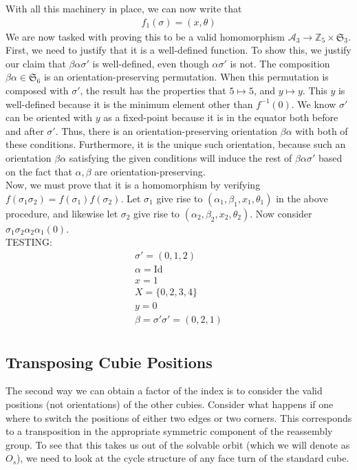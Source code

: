 \documentclass[10pt,letterpaper]{report}
\begin{document}
With all this machinery in place, we can now write that \begin{align*}
f_1(\sigma) = (x, \theta)
\end{align*}
We are now tasked with proving this to be a valid homomorphism $\mathcal{A}_3 \rightarrow \mathbb{Z}_5 \times \mathfrak{S}_3$.  First, we need to justify that it is a well-defined function.  To show this, we justify our claim that $\beta \alpha \sigma'$ is well-defined, even though $\alpha \sigma'$ is not.  The composition $\beta \alpha \in \mathfrak{S}_6$ is an orientation-preserving permutation.  When this permutation is composed with $\sigma'$, the result has the properties that $5 \mapsto 5$, and $y \mapsto y$.  This $y$ is well-defined because it is the minimum element other than $f^{-1}(0)$.  We know $\sigma'$ can be oriented with $y$ as a fixed-point because it is in the equator both before and after $\sigma'$.  Thus, there is an orientation-preserving orientation $\beta \alpha$ with both of these conditions.  Furthermore, it is the unique such orientation, because such an orientation $\beta \alpha$ satisfying the given conditions will induce the rest of $\beta \alpha \sigma'$ based on the fact that $\alpha, \beta$ are orientation-preserving. \\

Now, we must prove that it is a homomorphism by verifying $f(\sigma_1 \sigma_2) = f(\sigma_1)f(\sigma_2)$.  Let $\sigma_1$ give rise to $(\alpha_1, \beta_1, x_1, \theta_1)$ in the above procedure, and likewise let $\sigma_2$ give rise to $(\alpha_2, \beta_2, x_2, \theta_2)$.  Now consider $\sigma_1 \sigma_2 \alpha_2 \alpha_1 (0)$. \\

TESTING: \begin{align*}
\sigma' = (0,1,2) \\
\alpha = \text{Id} \\
x = 1 \\
X = \{0,2,3,4\} \\
y = 0 \\
\beta = 
\sigma' \sigma' = (0,2,1) \\
\end{align*}

\subsection{Transposing Cubie Positions}

The second way we can obtain a factor of the index is to consider the valid positions (not orientations) of the other cubies.  Consider what happens if one where to switch the positions of either two edges or two corners.  This corresponds to a transposition in the appropriate symmetric component of the reassembly group.  To see that this takes us out of the solvable orbit (which we will denote as $O_s$), we need to look at the cycle structure of any face turn of the standard cube. \\
\end{document}
